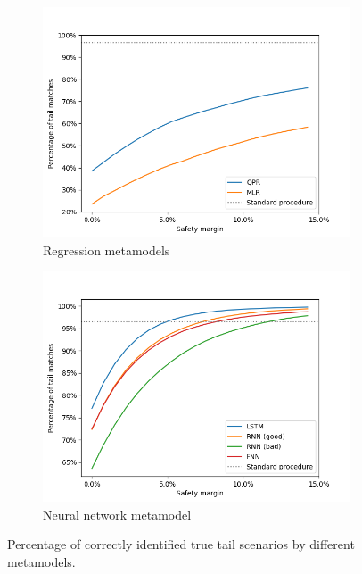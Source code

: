 \begin{figure}[ht!]
    \centering
    \begin{subfigure}{0.48\textwidth}
        \includegraphics[width=\textwidth]{./project2/figures/tailMatches/regLN.png}
        \caption{Regression metamodels}
    \end{subfigure}\hfill
    \begin{subfigure}{0.48\textwidth}
        \includegraphics[width=\textwidth]{./project2/figures/tailMatches/nnLN.png}
        \caption{Neural network metamodel}
    \end{subfigure}
    \caption{Percentage of correctly identified true tail scenarios by different metamodels.}
    \label{fig2:tailMatches}
\end{figure}

